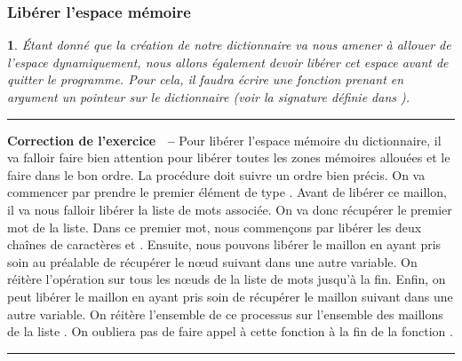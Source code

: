\documentclass[a4paper]{article}
\newenvironment{Correction}{\par\tiny\blue\rule[1ex]{\textwidth}{1pt}\par\normalsize\textbf{\sffamily{}Correction de l'exercice~\theExo{} -- }}{\par\tiny\blue\rule[1ex]{\textwidth}{1pt}\par}
\newtheorem{Exo}{{\sffamily{Exercice}}}
\begin{document}
			\subsubsection{Libérer l'espace mémoire}
				\begin{Exo}
					Étant donné que la création de notre dictionnaire va nous amener à allouer de l'espace dynamiquement, nous allons également devoir libérer cet espace avant de quitter le programme.
					Pour cela, il faudra écrire une fonction prenant en argument un pointeur sur le dictionnaire (voir la signature définie dans ).
				\end{Exo}
				\begin{Correction}
					Pour libérer l'espace mémoire du dictionnaire, il va falloir faire bien attention pour libérer toutes les zones mémoires allouées et le faire dans le bon ordre.
					La procédure doit suivre un ordre bien précis.
					On va commencer par prendre le premier élément de type .
					Avant de libérer ce maillon, il va nous falloir libérer la liste de mots associée.
					On va donc récupérer le premier mot de la liste.
					Dans ce premier mot, nous commençons par libérer les deux chaînes de caractères  et .
					Ensuite, nous pouvons libérer le maillon  en ayant pris soin au préalable de récupérer le nœud suivant dans une autre variable.
					On réitère l'opération sur tous les nœuds de la liste de mots jusqu'à la fin.
					Enfin, on peut libérer le maillon  en ayant pris soin de récupérer le maillon suivant dans une autre variable.
					On réitère l'ensemble de ce processus sur l'ensemble des maillons de la liste .
					On oubliera pas de faire appel à cette fonction à la fin de la fonction .
				\end{Correction}
\end{document}
